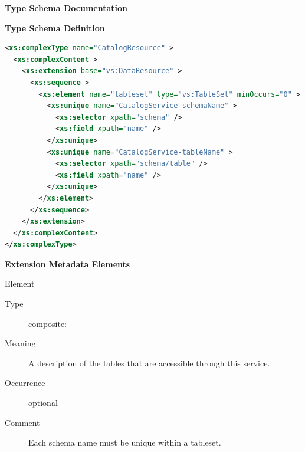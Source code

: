 \documentclass[11pt,a4paper]{ivoa}
\begin{document}
\begin{generated}
\begingroup
      	\renewcommand*\descriptionlabel[1]{%
      	\hbox to 5.5em{\emph{#1}\hfil}}\vspace{2ex}\noindent\textbf{ Type Schema Documentation}



\vspace{1ex}\noindent\textbf{ Type Schema Definition}

\begin{lstlisting}[language=XML,basicstyle=\footnotesize]
<xs:complexType name="CatalogResource" >
  <xs:complexContent >
    <xs:extension base="vs:DataResource" >
      <xs:sequence >
        <xs:element name="tableset" type="vs:TableSet" minOccurs="0" >
          <xs:unique name="CatalogService-schemaName" >
            <xs:selector xpath="schema" />
            <xs:field xpath="name" />
          </xs:unique>
          <xs:unique name="CatalogService-tableName" >
            <xs:selector xpath="schema/table" />
            <xs:field xpath="name" />
          </xs:unique>
        </xs:element>
      </xs:sequence>
    </xs:extension>
  </xs:complexContent>
</xs:complexType>
\end{lstlisting}

\vspace{0.5ex}\noindent\textbf{ Extension Metadata Elements}

\begingroup\small\begin{bigdescription}\item[Element \xmlel{tableset}]
\begin{description}
\item[Type] composite: 
\item[Meaning] 
                       A description of the tables that are accessible
                       through this service.
                     
\item[Occurrence] optional
\item[Comment] 
                     	Each schema name must be unique within a tableset.
                     

\end{description}


\end{bigdescription}\endgroup

\endgroup
\end{generated}
\end{document}
